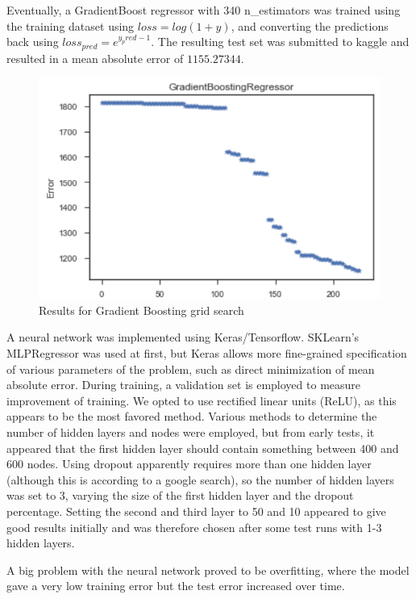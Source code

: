 \documentclass[a4paper]{article}
\begin{document}
Eventually, a GradientBoost regressor with  340 n\_estimators was trained using the training dataset using $loss=log(1 + y)$, and converting the predictions back using $loss_{pred} = e^{y_pred-1}$.  The resulting test set was submitted to kaggle and resulted in a mean absolute error of $1155.27344$.

\begin{figure}[H]
\centering
\includegraphics{Images/gbr.png}
\caption{Results for Gradient Boosting grid search}
\label{fig:gbr}
\end{figure}

A neural network was implemented using Keras/Tensorflow.  SKLearn's MLPRegressor was used at first, but Keras allows more fine-grained specification of various parameters of the problem, such as direct minimization of mean absolute error.  During training, a validation set is employed to measure improvement of training.  We opted to use rectified linear units (ReLU), as this appears to be the most favored method.  Various methods to determine the number of hidden layers and nodes were employed, but from early tests, it appeared that the first hidden layer should contain something between 400 and 600 nodes.  Using dropout apparently requires more than one hidden layer (although this is according to a google search), so the number of hidden layers was  set to 3, varying the size of the first hidden layer and the dropout percentage.  Setting the second and third layer to 50 and 10 appeared to give good results initially and was therefore chosen after some test runs with 1-3 hidden layers.

A big problem with the neural network proved to be overfitting, where the model gave a very low training error but the test error increased over time.  
\end{document}
